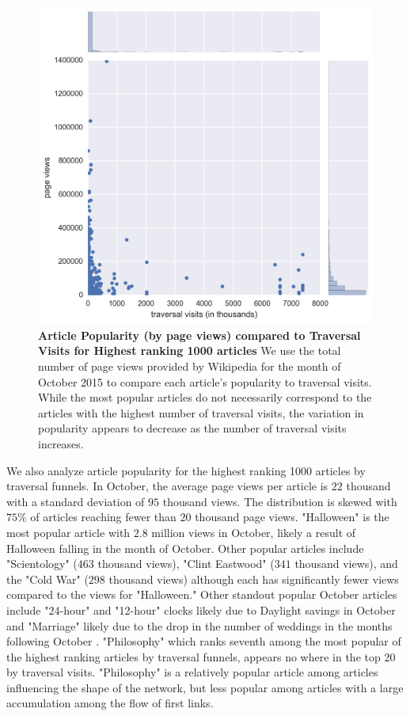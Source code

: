 \documentclass[pre,twocolumn,twoside,superscriptaddress,floatfix, aps, 10pt]{revtex4-1}
\begin{document}
\begin{figure}[tp!]
  \centering	
  \includegraphics[width=\columnwidth]{graphics/views_visits.png}
  \caption{
    \textbf{Article Popularity (by page views) compared to Traversal Visits 
    for Highest ranking 1000 articles}
    We use the total number of page views provided by Wikipedia for the month
    of October 2015 to compare each article's popularity to traversal visits.
    While the most popular articles do not necessarily correspond to the articles
    with the highest number of traversal visits, the variation in popularity appears to decrease as the number of traversal visits increases.
  }
  \label{fig:Views and Visits}

\end{figure}



We also analyze article popularity for the highest ranking 1000 articles by 
traversal funnels. In October, the average page views per article is 
$22$ thousand with a standard deviation of $95$ thousand views. The distribution
is skewed with $75\%$ of articles reaching fewer than $20$ thousand page views. 
"Halloween" is the most popular article with $2.8$ million views in October,
likely a result of Halloween falling in the month of October. 
Other popular articles include "Scientology" ($463$ thousand views), "Clint Eastwood" 
($341$ thousand views),
and the "Cold War" ($298$ thousand views) although each has significantly fewer views compared to the views for "Halloween."
Other standout popular October articles include "24-hour" and "12-hour" clocks likely due
to Daylight savings in October and "Marriage" likely due to the drop in the number of
weddings in the months following October
\cite{weddings}.
"Philosophy" which ranks seventh among the most popular of the highest ranking articles by traversal funnels, appears no where in the top 20
by traversal visits. "Philosophy" is a relatively popular article 
among articles influencing the shape of the network, but less popular among 
articles with a large accumulation among the flow of first links.
\end{document}

